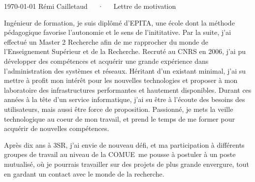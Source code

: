 \documentclass[11pt, a4paper]{awesome-cv}
\begin{document}
\makecvheader[R]

\makecvfooter
  {\today}
  {Rémi Cailletaud~~~·~~~Lettre de motivation}
  {}

\makelettertitle

\begin{cvletter}
Ingénieur de formation, je suis diplômé d'EPITA, une école dont la méthode pédagogique favorise l'autonomie et le sens de l'inititative. Par la suite, j'ai effectué un Master 2 Recherche afin de me rapprocher du monde de l'Enseignement Supérieur et de la Recherche. Recruté au CNRS en 2006, j'ai pu développer des compétences et acquérir une grande expérience dans l'administration des systèmes et réseaux. Héritant d'un existant minimal, j'ai su mettre à profit mon intérêt pour les nouvelles technologies et proposer à mon laboratoire des infrastructures performantes et hautement disponibles. Durant ces années à la tête d'un service informatique, j'ai su être à l'écoute des besoins des utilisateurs, mais aussi être force de proposition. Passionné, je mets la veille technologique au coeur de mon travail, et prend le temps de me former pour acquérir de nouvelles compétences.

Après dix ans à 3SR, j'ai envie de nouveau défi, et ma participation à différents groupes de travail au niveau de la COMUE me pousse à postuler à un poste mutualisé, où je pourrais travailler sur des projets de plus grande envergure, tout en gardant un contact avec le monde de la recherche.


\end{cvletter}
\end{document}
